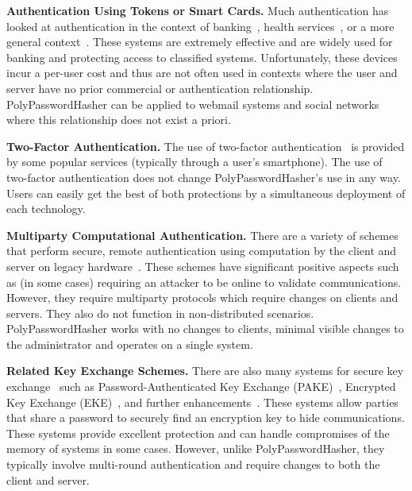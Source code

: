 {\bf Authentication Using Tokens or Smart Cards.}
Much authentication has looked at authentication in the context of
banking~\cite{deo1998authentication, yeh2010two}, health 
services~\cite{ahn2002towards},
or a more general context~\cite{chien2002efficient, yang1999password}.   These 
systems are
extremely effective and are widely used for banking and protecting access
to classified systems.   Unfortunately, these devices incur a per-user 
cost and thus are not often used in contexts where the user and server have
no prior commercial or authentication relationship.   PolyPasswordHasher can 
be applied to webmail systems and social networks where this relationship
does not exist a priori.

{\bf Two-Factor Authentication.}
The use of two-factor authentication~\cite{di2005two} is provided by some 
popular services (typically through a user's smartphone).   The use of 
two-factor authentication does not
change PolyPasswordHasher's use in any way.   Users can easily get the best of both
protections by a simultaneous deployment of each technology.



{\bf Multiparty Computational Authentication.}
There are a variety of schemes that perform secure, remote authentication using
computation by the client and server on legacy hardware~\cite{wu1998secure,
Lomas_SOSP_89, chien2001modified, jan1998paramita, gong1995optimal, 
camenisch2010credential, brainard2003nightingale,
katz2001efficient, katz2003forward, gong1993protecting}.  These schemes have 
significant positive aspects such as (in some cases) requiring an attacker to 
be online to validate communications.   However, they require multiparty 
protocols which require changes on clients and servers.   They also do not 
function in non-distributed scenarios.   PolyPasswordHasher works with no 
changes to clients, minimal visible changes to the administrator and
operates on a single system.


{\bf Related Key Exchange Schemes.}
There are also many systems for secure key exchange~\cite{shoup1999formal} 
such as Pass\-word-Au\-then\-ti\-cated Key Exchange
(PAKE)~\cite{boyko2000provably, shen2010towards,sathik2010secret, 
jablon1996strong}, Encrypted Key Exchange (EKE)~\cite{steiner1995refinement,
lucks1998open, jablon1997extended}, and further 
enhancements~\cite{wang2005strengthening}.   These 
systems allow parties that
share a password to securely find an encryption key to hide communications.   
These systems provide excellent protection and can handle compromises
of the memory of systems in some cases.   However, unlike PolyPasswordHasher, they 
typically involve multi-round authentication and require changes to both the 
client and server.   

